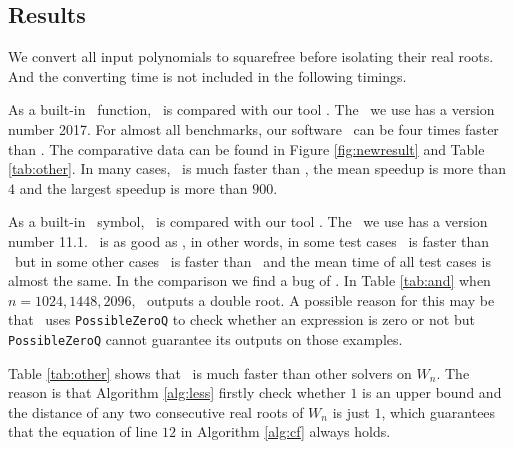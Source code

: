  \subsection{Results}
We  convert all input polynomials to squarefree before isolating their real roots. And the converting time is not included in the following timings.

As a  built-in  \MAPLE\ function, \REALROOT\ is    compared with  our tool \froot.
 	The   \MAPLE\  we use has a version number 2017.  For  almost all
 benchmarks, our  software \froot\  can be  four  times faster than \REALROOT. The comparative data can be found in Figure \ref{fig:newresult} and Table \ref{tab:other}. In many cases, \froot\ is much faster than \REALROOT, the mean speedup is more than $4$ and the largest speedup is more than $900$. 

 As a  built-in \MM\ symbol, \inte\ is    compared with  our tool \froot. The  \MM\  we use has a version number 11.1.
 	\froot\ is as good as \inte, in other words, in some test cases \froot\ is faster than \inte\ but in some other cases \inte\ is faster than \froot\ and the mean time of all test cases is  almost the same. 
 	  In the comparison we find a bug of \inte. In Table \ref{tab:and} when $n=1024,1448,2096$, \inte\ outputs a double root. A possible reason for this may be that \inte\ uses {\tt PossibleZeroQ} to check whether an expression is zero or not but {\tt PossibleZeroQ} cannot guarantee its outputs on those examples.

Table \ref{tab:other} shows that \froot\ is much faster than other solvers on $W_n$. The reason is that Algorithm \ref{alg:less} firstly check whether $1$ is an upper bound and the distance of any two consecutive real roots of $W_n$ is just $1$, which guarantees that the equation of  line $12$ in Algorithm  \ref{alg:cf}  always holds.


